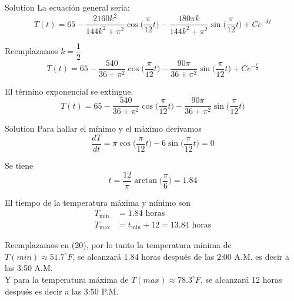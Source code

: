 \documentclass[10 pt]{beamer}
\begin{document}
\begin{frame}
    \begin{block}{Solution}
        La ecuación general seria:
        \begin{equation}
            T(t) = 65 - \dfrac{2160k^{2}}{144k^{2} + \pi^{2}} \cos\bigg(\dfrac{\pi}{12}t\bigg) - \dfrac{180\pi k}{144k^{2} + \pi^{2}} \sin\bigg(\dfrac{\pi}{12}t\bigg) + Ce^{-kt}
        \end{equation}

        Reemplazamos $k = \dfrac{1}{2}$
        \begin{equation}
            T(t) = 65 - \dfrac{540}{36 + \pi^{2}} \cos\bigg(\dfrac{\pi}{12}t\bigg) - \dfrac{90\pi}{36 + \pi^{2}} \sin\bigg(\dfrac{\pi}{12}t\bigg) +  Ce^{-\frac{t}{2}}
        \end{equation}

        El término exponencial se extingue.
        \begin{equation}
            T(t) = 65 - \dfrac{540}{36 + \pi^{2}} \cos\bigg(\dfrac{\pi}{12}t\bigg) - \dfrac{90\pi}{36 + \pi^{2}} \sin\bigg(\dfrac{\pi}{12}t\bigg)
        \end{equation}
    \end{block}
\end{frame}

\begin{frame}
    \begin{block}{Solution}
        Para hallar el mínimo y el máximo derivamos
        \begin{equation}
            \dfrac{dT}{dt} = \pi\cos\bigg(\dfrac{\pi}{12}t\bigg) - 6\sin\bigg(\dfrac{\pi}{12}t\bigg) = 0
        \end{equation}

        Se tiene
        \begin{equation}
            t = \dfrac{12}{\pi} \arctan\bigg(\dfrac{\pi}{6}\bigg) = 1.84
        \end{equation}

        El tiempo de la temperatura máxima y mínimo son
        \begin{align*}
            T_\text{min} & = 1.84 \text{ horas}                      \\
            T_\text{max} & = t_\text{min} + 12 = 13.84 \text{ horas}
        \end{align*}

        Reemplazamos en (20), por lo tanto la temperatura mínima de $T(min) \approx 51.7^{\circ} F$, se alcanzará 1.84 horas después de las 2:00 A.M. es decir a las 3:50 A.M. \\

        Y para la temperatura máxima de $T(max) \approx 78.3^{\circ} F$, se alcanzará 12 horas después es decir a las 3:50 P.M.
    \end{block}
\end{frame}
\end{document}
